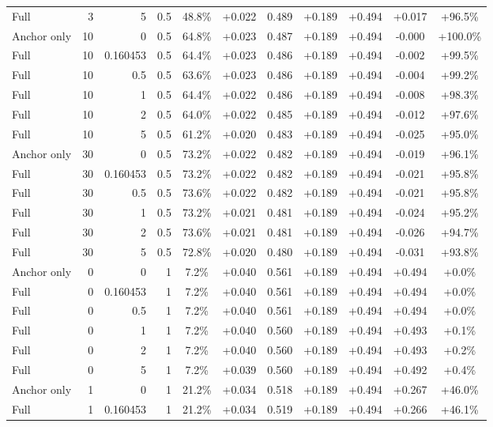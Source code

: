 \begin{table}[htbp]
\begin{tabular}{lrrrccccccc}
Full & 3 & 5 & 0.5 & 48.8\% & +0.022 & 0.489 & +0.189 & +0.494 & +0.017 & +96.5\% \\
Anchor only & 10 & 0 & 0.5 & 64.8\% & +0.023 & 0.487 & +0.189 & +0.494 & -0.000 & +100.0\% \\
Full & 10 & 0.160453 & 0.5 & 64.4\% & +0.023 & 0.486 & +0.189 & +0.494 & -0.002 & +99.5\% \\
Full & 10 & 0.5 & 0.5 & 63.6\% & +0.023 & 0.486 & +0.189 & +0.494 & -0.004 & +99.2\% \\
Full & 10 & 1 & 0.5 & 64.4\% & +0.022 & 0.486 & +0.189 & +0.494 & -0.008 & +98.3\% \\
Full & 10 & 2 & 0.5 & 64.0\% & +0.022 & 0.485 & +0.189 & +0.494 & -0.012 & +97.6\% \\
Full & 10 & 5 & 0.5 & 61.2\% & +0.020 & 0.483 & +0.189 & +0.494 & -0.025 & +95.0\% \\
Anchor only & 30 & 0 & 0.5 & 73.2\% & +0.022 & 0.482 & +0.189 & +0.494 & -0.019 & +96.1\% \\
Full & 30 & 0.160453 & 0.5 & 73.2\% & +0.022 & 0.482 & +0.189 & +0.494 & -0.021 & +95.8\% \\
Full & 30 & 0.5 & 0.5 & 73.6\% & +0.022 & 0.482 & +0.189 & +0.494 & -0.021 & +95.8\% \\
Full & 30 & 1 & 0.5 & 73.2\% & +0.021 & 0.481 & +0.189 & +0.494 & -0.024 & +95.2\% \\
Full & 30 & 2 & 0.5 & 73.6\% & +0.021 & 0.481 & +0.189 & +0.494 & -0.026 & +94.7\% \\
Full & 30 & 5 & 0.5 & 72.8\% & +0.020 & 0.480 & +0.189 & +0.494 & -0.031 & +93.8\% \\
Anchor only & 0 & 0 & 1 & 7.2\% & +0.040 & 0.561 & +0.189 & +0.494 & +0.494 & +0.0\% \\
Full & 0 & 0.160453 & 1 & 7.2\% & +0.040 & 0.561 & +0.189 & +0.494 & +0.494 & +0.0\% \\
Full & 0 & 0.5 & 1 & 7.2\% & +0.040 & 0.561 & +0.189 & +0.494 & +0.494 & +0.0\% \\
Full & 0 & 1 & 1 & 7.2\% & +0.040 & 0.560 & +0.189 & +0.494 & +0.493 & +0.1\% \\
Full & 0 & 2 & 1 & 7.2\% & +0.040 & 0.560 & +0.189 & +0.494 & +0.493 & +0.2\% \\
Full & 0 & 5 & 1 & 7.2\% & +0.039 & 0.560 & +0.189 & +0.494 & +0.492 & +0.4\% \\
Anchor only & 1 & 0 & 1 & 21.2\% & +0.034 & 0.518 & +0.189 & +0.494 & +0.267 & +46.0\% \\
Full & 1 & 0.160453 & 1 & 21.2\% & +0.034 & 0.519 & +0.189 & +0.494 & +0.266 & +46.1\% \\

\end{tabular}
\end{table}
